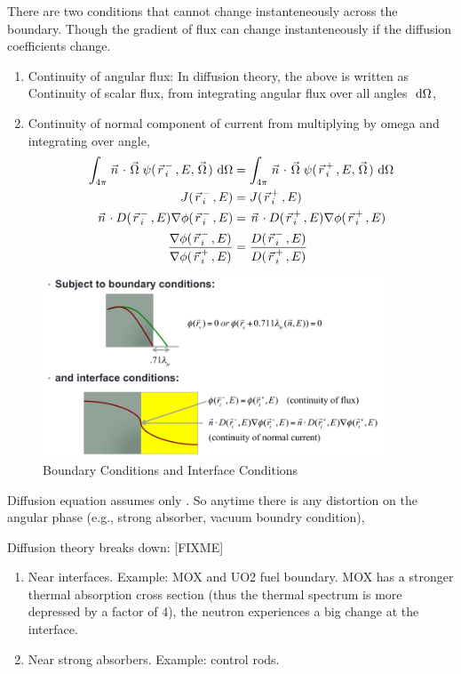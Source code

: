 \documentclass{school-22.211-notes}
\begin{document}
\clearpage
{}
There are two conditions that cannot change instanteneously across the boundary. Though the gradient of flux can change instanteneously if the diffusion coefficients change. 
\begin{enumerate}
\item Continuity of angular flux: 
  In diffusion theory, the above is written as Continuity of scalar flux, from integrating angular flux over all angles $\mbox{ }\mathrm{d} \Omega$, 
\item Continuity of normal component of current from multiplying by omega and integrating over angle, 
  \begin{align}
    \int_{4\pi} \left.\vec{n}\right. \cdot \left.\vec{\Omega}\right. \psi(\left.\vec{r}\right._i^-, E, \left.\vec{\Omega}\right.) \mbox{ }\mathrm{d} \Omega &= \int_{4\pi} \left.\vec{n}\right. \cdot \left.\vec{\Omega}\right. \psi(\left.\vec{r}\right._i^+, E, \left.\vec{\Omega}\right.) \mbox{ }\mathrm{d} \Omega \\
    J(\left.\vec{r}\right._i^-, E) &= J(\left.\vec{r}\right._i^+, E) \\
    \left.\vec{n}\right. \cdot D(\left.\vec{r}\right._i^-, E) \nabla \phi(\left.\vec{r}\right._i^-, E) &= \left.\vec{n}\right. \cdot D(\left.\vec{r}\right._i^+, E) \nabla \phi(\left.\vec{r}\right._i^+, E) \\
    \frac{\nabla \phi(\left.\vec{r}\right._i^-, E)}{\nabla \phi(\left.\vec{r}\right._i^+, E)} &= \frac{D(\left.\vec{r}\right._i^-, E)}{D(\left.\vec{r}\right._i^+, E)} 
  \end{align}
\end{enumerate}


\begin{figure}
  \centering
  \includegraphics[width=4in]{images/dfs/boundary-interface.png}
  \caption{Boundary Conditions and Interface Conditions} \label{boundary-interface}
\end{figure}

\clearpage
{}
Diffusion equation assumes only . So anytime there is any distortion on the angular phase (e.g., strong absorber, vacuum boundry condition), 

Diffusion theory breaks down: [FIXME]
\begin{enumerate}
\item Near interfaces. Example: MOX and UO2 fuel boundary. MOX has a stronger thermal absorption cross section (thus the thermal spectrum is more depressed by a factor of 4), the neutron experiences a big change at the interface. 
\item Near strong absorbers. Example: control rods. 
\end{enumerate}
\end{document}
